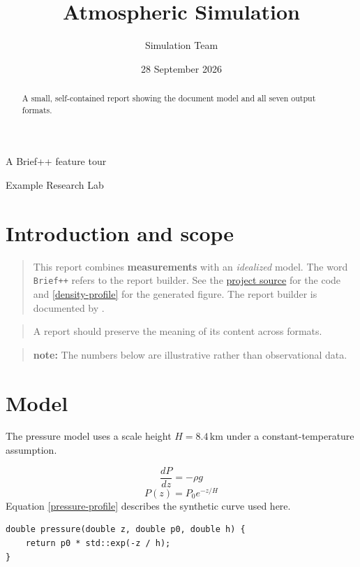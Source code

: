 \documentclass[11pt,a4paper]{article}
\title{Atmospheric Simulation}
\author{Simulation Team}
\date{28 September 2026}
\begin{document}
\maketitle
\begin{center}\large A Brief++ feature tour\end{center}
\begin{center}Example Research Lab\end{center}
\begin{abstract}
A small, self-contained report showing the document model and all seven output formats.
\end{abstract}
\section{Introduction and scope}\label{introduction}
\begin{quote}
This report combines \textbf{measurements} with an \emph{idealized} model. The word \texttt{Brief++} refers to the report builder. See the \href{https://github.com/vrtulka23/briefpp}{project source} for the code and \ref{density-profile} for the generated figure. The report builder is documented by \cite{example2026}.

\end{quote}
\begin{quote}
A report should preserve the meaning of its content across formats.
\end{quote}
\begin{quote}\textbf{note:} The numbers below are illustrative rather than observational data.\end{quote}
\section{Model}\label{model}
The pressure model uses a scale height \(H = 8.4\,\mathrm{km}\) under a constant-temperature assumption.

\begin{equation}
\frac{dP}{dz} = -\rho g
\label{hydrostatic}
\end{equation}
\begin{equation}
P(z) = P_0 e^{-z/H}
\label{pressure-profile}
\end{equation}
Equation \ref{pressure-profile} describes the synthetic curve used here.

\begin{verbatim}
double pressure(double z, double p0, double h) {
    return p0 * std::exp(-z / h);
}
\end{verbatim}
\end{document}
